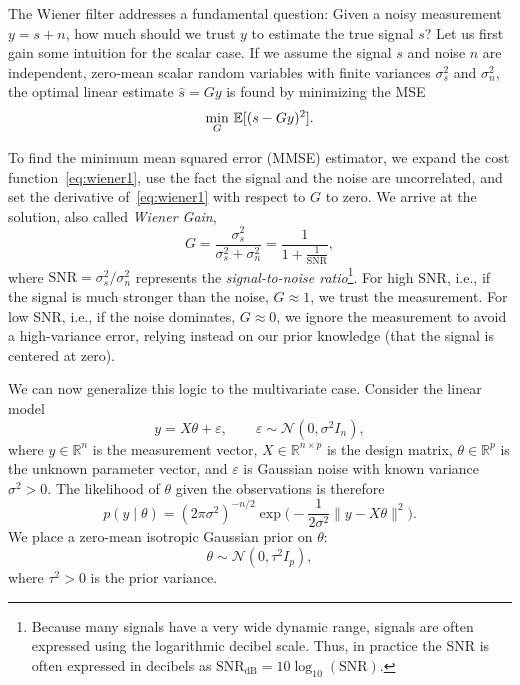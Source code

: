 
\medskip

The Wiener filter addresses a fundamental question: Given a noisy measurement $y = s + n$, how much should we trust $y$ to estimate the true signal $s$?
Let us first gain some intuition for the scalar case.
If we assume the signal $s$ and noise $n$ are independent, zero-mean scalar random variables with finite variances $\sigma_s^2$ and $\sigma_n^2$, the optimal linear estimate $\hat{s} = Gy$ is found by minimizing the MSE
\begin{equation}\label{eq:wiener1}
\min_{G} \, \mathbb{E}[(s - Gy)^2].
\end{equation}

To find the minimum mean squared error (MMSE) estimator, we expand the cost function~\eqref{eq:wiener1}, use the fact the signal and the noise are uncorrelated, and set the
derivative of~\eqref{eq:wiener1} with respect to $G$ to zero. We arrive at the solution, also called {\em Wiener Gain},
$$G = \frac{\sigma_s^2}{\sigma_s^2 + \sigma_n^2} = \frac{1}{1 + \frac{1}{\text{SNR}}},$$
where $\text{SNR} = \sigma_s^2 / \sigma_n^2$
represents the {\em signal-to-noise ratio}\footnote{Because many signals have a very wide dynamic range, signals are often expressed using the logarithmic decibel scale. Thus, in practice the SNR is often expressed in decibels as
$\text{SNR}_{\text{dB}} =10\log_{10}(\text{SNR})$.}.
For high SNR, i.e., if the signal is much stronger than the noise, $G \approx 1$, we trust the measurement. For low SNR, i.e., if the noise dominates, $G \approx 0$, we ignore the measurement to avoid a high-variance error, relying instead on our prior knowledge (that the signal is centered at zero).

We can now generalize this logic to the multivariate case.
Consider the linear model
\begin{equation}
  \label{eq:linear_model}
  y = X\theta + \varepsilon,
  \qquad
  \varepsilon \sim \mathcal{N}(0, \sigma^2 I_n),
\end{equation}
where $y \in \mathbb{R}^n$ is the measurement vector, $X \in \mathbb{R}^{n \times p}$
is the design matrix, $\theta \in \mathbb{R}^p$ is the unknown parameter vector,
and $\varepsilon$ is Gaussian noise with known variance $\sigma^2 > 0$.  The
likelihood of $\theta$ given the observations is therefore
\begin{equation}
  \label{eq:wiener2}
  p(y \mid \theta)
  = (2\pi\sigma^2)^{-n/2}
    \exp \Big(-\frac{1}{2\sigma^2}\|y - X\theta\|^2\Big).
\end{equation}
We place a zero-mean isotropic Gaussian prior on $\theta$:
\begin{equation}
  \label{eq:prior}
  \theta \sim \mathcal{N}(0, \tau^2 I_p),
\end{equation}
where $\tau^2 > 0$ is the prior variance. 

